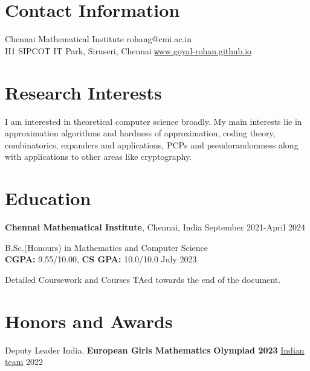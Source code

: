\documentclass[margin,line, 10pt]{res}
\begin{document}

\begin{resume}
\section{\sc Contact Information}
Chennai Mathematical Institute \hfill {rohang@cmi.ac.in}\\
H1 SIPCOT IT Park, Siruseri, Chennai \hfill \href{https://goyal-rohan.github.io/}{\texttt www.goyal-rohan.github.io}

\section{\sc Research Interests}
I am interested in theoretical computer science broadly. My main interests lie in approximation algorithms and hardness of approximation, coding theory, combinatorics, expanders and applications, PCPs and pseudorandomness along with applications to other areas like cryptography.
\section{\sc Education}


{\bf Chennai Mathematical Institute}, Chennai, India \hfill September 2021-April 2024

\vspace{-0.4cm}
B.Sc.(Honours) in Mathematics and Computer Science\\ {\bf CGPA:} 9.55/10.00, {\bf CS GPA:} 10.0/10.0 \hfill July 2023


\vspace*{-0.3cm}
Detailed Coursework and Courses TAed towards the end of the document.


\section{\sc Honors and Awards} 
Deputy Leader India, {\bf European Girls Mathematics Olympiad 2023} \href{https://www.egmo.org/egmos/egmo12/countries/country35/}{Indian team} \hfill 2022


\end{resume}
\end{document}
